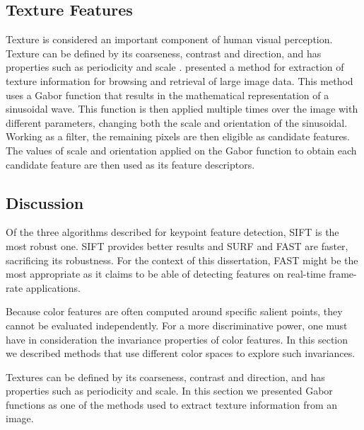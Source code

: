 \subsection{Texture Features}

Texture is considered an important component of human visual perception. Texture can be defined by its coarseness, contrast and direction, and has properties such as periodicity and scale \cite{howarth2004evaluation}.
\citeauthor{manjunath1996texture} \cite{manjunath1996texture} presented a method for extraction of texture information for browsing and retrieval of large image data. This method uses a Gabor function that results in the mathematical representation of a sinusoidal wave. This function is then applied multiple times over the image with different parameters, changing both the scale and orientation of the sinusoidal. Working as a filter, the remaining pixels are then eligible as candidate features. The values of scale and orientation applied on the Gabor function to obtain each candidate feature are then used as its feature descriptors.

\subsection{Discussion}

Of the three algorithms described for keypoint feature detection, SIFT is the most robust one. SIFT provides better results and SURF and FAST are faster, sacrificing its robustness. For the context of this dissertation, FAST might be the most appropriate as it claims to be able of detecting features on real-time frame-rate applications.

Because color features are often computed around specific salient points, they cannot be evaluated independently. For a more discriminative power, one must have in consideration the invariance properties of color features. In this section we described methods that use different color spaces to explore such invariances.

Textures can be defined by its coarseness, contrast and direction, and has properties such as periodicity and scale. In this section we presented Gabor functions as one of the methods used to extract texture information from an image.